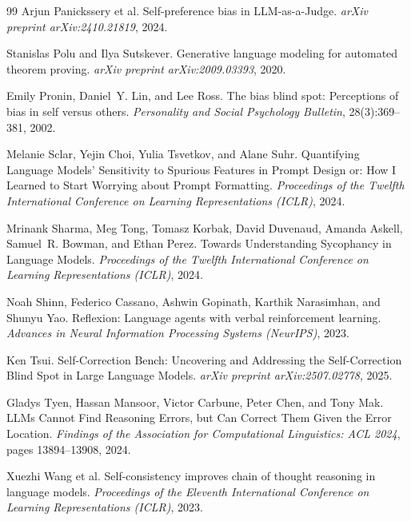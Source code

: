 \documentclass[11pt]{article}
\begin{document}
\begin{thebibliography}{99}
Arjun Panickssery et al.
\newblock Self-preference bias in LLM-as-a-Judge.
\newblock \emph{arXiv preprint arXiv:2410.21819}, 2024.

Stanislas Polu and Ilya Sutskever.
\newblock Generative language modeling for automated theorem proving.
\newblock \emph{arXiv preprint arXiv:2009.03393}, 2020.

Emily Pronin, Daniel~Y. Lin, and Lee Ross.
\newblock The bias blind spot: Perceptions of bias in self versus others.
\newblock \emph{Personality and Social Psychology Bulletin}, 28(3):369--381, 2002.

Melanie Sclar, Yejin Choi, Yulia Tsvetkov, and Alane Suhr.
\newblock Quantifying Language Models' Sensitivity to Spurious Features in Prompt Design or:
How I Learned to Start Worrying about Prompt Formatting.
\newblock \emph{Proceedings of the Twelfth International Conference on Learning
Representations (ICLR)}, 2024.

Mrinank Sharma, Meg Tong, Tomasz Korbak, David Duvenaud, Amanda Askell, Samuel~R. Bowman,
and Ethan Perez.
\newblock Towards Understanding Sycophancy in Language Models.
\newblock \emph{Proceedings of the Twelfth International Conference on Learning
Representations (ICLR)}, 2024.

Noah Shinn, Federico Cassano, Ashwin Gopinath, Karthik Narasimhan, and Shunyu Yao.
\newblock Reflexion: Language agents with verbal reinforcement learning.
\newblock \emph{Advances in Neural Information Processing Systems (NeurIPS)}, 2023.

Ken Tsui.
\newblock Self-Correction Bench: Uncovering and Addressing the Self-Correction Blind Spot in
Large Language Models.
\newblock \emph{arXiv preprint arXiv:2507.02778}, 2025.

Gladys Tyen, Hassan Mansoor, Victor Carbune, Peter Chen, and Tony Mak.
\newblock LLMs Cannot Find Reasoning Errors, but Can Correct Them Given the Error Location.
\newblock \emph{Findings of the Association for Computational Linguistics: ACL 2024},
pages 13894--13908, 2024.

Xuezhi Wang et al.
\newblock Self-consistency improves chain of thought reasoning in language models.
\newblock \emph{Proceedings of the Eleventh International Conference on Learning
Representations (ICLR)}, 2023.


\end{thebibliography}
\end{document}
